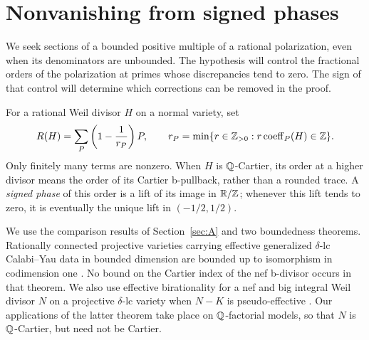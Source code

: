 \section{Nonvanishing from signed phases}\label{sec:B}

We seek sections of a bounded positive multiple of a rational
polarization, even when its denominators are unbounded.  The hypothesis
will control the fractional orders of the polarization at primes whose
discrepancies tend to zero.  The sign of that control will determine
which corrections can be removed in the proof.

For a rational Weil divisor $H$ on a normal variety, set
\begin{equation}\label{eq:B-ramification-boundary}
 R(H)=\sum_P\left(1-\frac1{r_P}\right)P,
 \qquad
 r_P=\min\{r\in\mathbb Z_{>0}:r\operatorname{coeff}_P(H)\in\mathbb Z\}.
\end{equation}
Only finitely many terms are nonzero.  When $H$ is $\mathbb Q$-Cartier, its
order at a higher divisor means the order of its Cartier b-pullback,
rather than a rounded trace.  A \emph{signed phase} of this order is a lift of its image in
$\mathbb R/\mathbb Z$; whenever this lift tends to zero, it is eventually the unique
lift in $(-1/2,1/2)$.

We use the comparison results of Section~\ref{sec:A} and two boundedness
theorems.  Rationally connected projective varieties carrying effective
generalized $\delta$-lc Calabi--Yau data in bounded dimension are bounded
up to isomorphism in codimension one
\cite[Theorem~1.7]{BirkarCY}.  No bound on the Cartier index of the nef
b-divisor occurs in that theorem.  We also use effective birationality
for a nef and big integral Weil divisor $N$ on a projective
$\delta$-lc variety when $N-K$ is pseudo-effective
\cite[Theorem~1.1]{BirkarPolarised}.  Our applications of the latter
theorem take place on $\mathbb Q$-factorial models, so that $N$ is
$\mathbb Q$-Cartier, but need not be Cartier.

